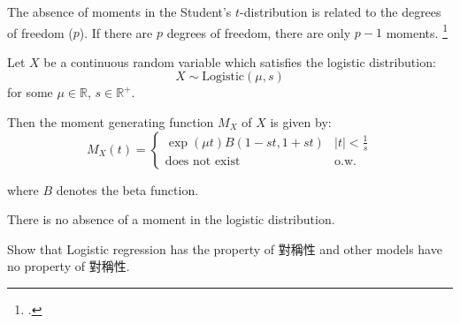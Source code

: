 \documentclass[UTF8,a4paper,10pt]{article}
\begin{document}
The absence of moments in the Student's $t$-distribution is related to the degrees of freedom ($p$). If there are \(p\) degrees of freedom, there are only \(p-1\) moments. \footcite[][224]{Casella2002}

\dotfill

Let $X$ be a continuous random variable which satisfies the logistic distribution:
\[X \sim \text{Logistic}(\mu, s)\]
for some $\mu \in \mathbb{R}$, $s \in \mathbb{R}^+$. 

Then the moment generating function $M_X$ of $X$ is given by:
\[M_X(t) = 
\begin{cases}
\exp(\mu t)B\left(1 - st, 1 + st\right) &  |t| < \frac{1}{s} \\
\text{does not exist} &\text{o.w.} 
\end{cases}
\]

where $B$ denotes the beta function.

There is no absence of a moment in the logistic distribution.


\pagebreak

\begin{Problem}[]{}
  

  Show that Logistic regression has the property of 對稱性 and other models have no property of 對稱性.
\end{Problem}
\end{document}
